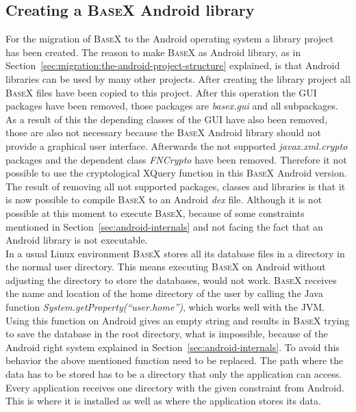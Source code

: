 \subsection{Creating a \textsc{BaseX} Android library}
\label{sec:migration:creating-a-basex-android-library}
For the migration of \textsc{BaseX} to the Android operating system a library project has been created.
The reason to make \textsc{BaseX} as Android library, as in Section~\ref{sec:migration:the-android-project-structure} explained, is that Android libraries can be used by many other projects.
After creating the library project all \textsc{BaseX} files have been copied to this project.
After this operation the GUI packages have been removed, those packages are \textit{basex.gui} and all subpackages.
As a result of this the depending classes of the GUI have also been removed, those are also not necessary because the \textsc{BaseX} Android library should not provide a graphical user interface.
Afterwards the not supported \textit{javax.xml.crypto} packages and the dependent class \textit{FNCrypto} have been removed.
Therefore it not possible to use the cryptological XQuery function in this \textsc{BaseX} Android version.\\
The result of removing all not supported packages, classes and libraries is that it is now possible to compile \textsc{BaseX} to an Android \textit{dex} file.
Although it is not possible at this moment to execute \textsc{BaseX}, because of some constraints mentioned in Section~\ref{sec:android-internals} and not facing the fact that an Android library is not executable.\\
In a usual Linux environment \textsc{BaseX} stores all its database files in a directory in the normal user directory.
This means executing \textsc{BaseX} on Android without adjusting the directory to store the databases, would not work.
\textsc{BaseX} receives the name and location of the home directory of the user by calling the Java function \textit{System.getProperty(``user.home'')}, which works well with the JVM.
Using this function on Android gives an empty string and results in \textsc{BaseX} trying to save the database in the root directory, what is impossible, because of the Android right system explained in Section~\ref{sec:android-internals}.
To avoid this behavior the above mentioned function need to be replaced.
The path where the data has to be stored has to be a directory that only the application can access.
Every application receives one directory with the given constraint from Android.
This is where it is installed as well as where the application stores its data.

